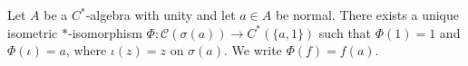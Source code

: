 Let $A$ be a $C^*$-algebra with unity and let $a \in A$ be normal. There exists a unique isometric $*$-isomorphism $\Phi: \mathcal{C}(\sigma(a)) \to C^*(\{a, 1\})$ such that $\Phi(1) = 1$ and $\Phi(\iota) = a$, where $\iota(z) = z$ on $\sigma(a)$. We write $\Phi(f) = f(a)$.
